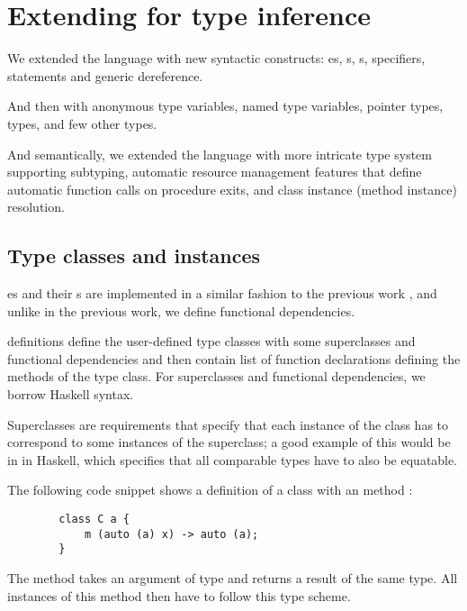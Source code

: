 \section{Extending \cmm{} for type inference}

We extended the language with new syntactic constructs: es, s, s,  specifiers,  statements and \li{[ptr]} generic dereference.

And then with  anonymous type variables,  named type variables,  pointer types,  types, and few other types.

And semantically, we extended the language with more intricate type system supporting subtyping, automatic resource management features that define automatic function calls on procedure exits, and class instance (method instance) resolution.

\subsection{Type classes and instances}

es and their s are implemented in a similar fashion to the previous work \cite{klepl2020type}, and unlike in the previous work, we define functional dependencies.

 definitions define the user-defined type classes with some superclasses and functional dependencies and then contain list of function declarations defining the methods of the type class. For superclasses and functional dependencies, we borrow Haskell syntax.

Superclasses are requirements that specify that each instance of the class has to correspond to some instances of the superclass; a good example of this would be  in  in Haskell, which specifies that all comparable types have to also be equatable.

\begin{ex}[Classes]
    The following code snippet shows a definition of a class  with an method :

    \begin{lstlisting}
        class C a {
            m (auto (a) x) -> auto (a);
        }
    \end{lstlisting}

    The method  takes an argument of type  and returns a result of the same type. All instances of this method then have to follow this type scheme.
\end{ex}

